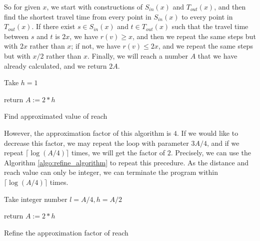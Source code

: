 \documentclass[titlepage,11pt,a4paper]{article}
\begin{document}
So for given $x$, we start with constructions of $S_{in}(x)$ and $T_{out}(x)$, and then find the shortest travel time from every point in $S_{in}(x)$ to every point in $T_{out}(x)$. If there exist $s\in S_{in}(x)$ and $t\in T_{out}(x)$ such that the travel time between $s$ and $t$ is $2x$, we have $r(v)\geq x$, and then we repeat the same steps but with $2x$ rather than $x$; if not, we have $r(v)\leq 2x$, and we repeat the same steps but with $x/2$ rather than $x$. Finally, we will reach a number $A$ that we have already calculated, and we return $2A$.


\begin{algorithm}[H]
 \KwResult{a value A such that $r(v)$ is in the range $[A/4, A)$.}
 Take $h=1$\;


return $A := 2*h$\;

\caption{Find approximated value of reach}
\end{algorithm}

However, the approximation factor of this algorithm is $4$. If we would like to decrease this factor, we may repeat the loop with parameter $3A/4$, and if we repeat $\lceil\log(A/4)\rceil$ times, we will get the factor of $2$. Precisely, we can use the Algorithm \ref{algo:refine_algorithm} to repeat this precedure. As the distance and reach value can only be integer, we can terminate the program within $\lceil\log(A/4)\rceil$ times.\\

\begin{algorithm}[H]
 \KwData{value $A$ such that $r(v)$ is in the range $[A/4, A)$.}
 \KwResult{value $A^*$ such that $r(v)$ is in the range $[A^*/2, A^*)$.}
 Take integer number $l=A/4, h=A/2$\;

return $A := 2*h$\;

\caption{Refine the approximation factor of reach}
\label{algo:refine_algorithm}
\end{algorithm}
\end{document}
